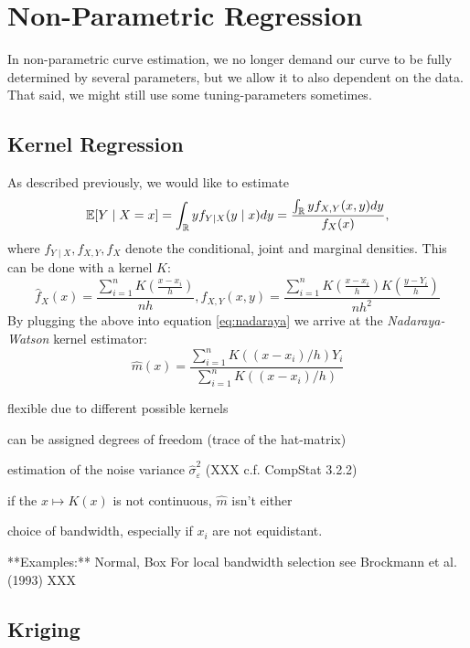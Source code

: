 \section{Non-Parametric Regression}
In non-parametric curve estimation, we no longer demand our curve to be fully determined by several parameters, but we allow it to also dependent on the data. That said, we might still use some tuning-parameters sometimes.
\subsection{Kernel Regression}
\label{sec:Kernel}
As described previously, we would like to estimate
\begin{equation}
  \label{eq:nadaraya}
  \mathbb{E}[Y \mid X=x]
  = \int_{\mathbb{R}} y f_{Y \mid X}(y \mid x) d y
  =\frac{\int_{\mathbb{R}} y f_{X, Y}(x, y) d y}{f_{X}(x)},
\end{equation}
where $f_{Y \mid X}, f_{X, Y}, f_{X}$ denote the conditional, joint and marginal densities.
This can be done with a kernel $K$:
$$
  \hat{f}_{X}(x)=\frac{\sum_{i=1}^{n} K\left(\frac{x-x_{i}}{h}\right)}{n h}, \hat{f}_{X, Y}(x, y)=\frac{\sum_{i=1}^{n} K\left(\frac{x-x_{i}}{h}\right) K\left(\frac{y-Y_{i}}{h}\right)}{n h^{2}}
$$
By plugging the above into equation \ref{eq:nadaraya} we arrive at the \textit{Nadaraya-Watson} kernel estimator:
$$\hat{m}(x)=\frac{\sum_{i=1}^{n} K\left(\left(x-x_{i}\right) / h\right) Y_{i}}{\sum_{i=1}^{n} K\left(\left(x-x_{i}\right) / h\right)}$$


\begin{my_pros_cons_table}{
    \item flexible due to different possible kernels
    \item can be assigned degrees of freedom (trace of the hat-matrix)
    \item estimation of the noise variance $\hat \sigma_\varepsilon^2$ (XXX c.f. CompStat 3.2.2)
  }{
    \item if the $x \mapsto K(x)$ is not continuous, $\hat m $ isn't either
    \item choice of bandwidth, especially if $x_i$ are not equidistant.
  }
\end{my_pros_cons_table}


**Examples:**
Normal, Box
For local bandwidth selection see Brockmann et al. (1993) XXX


\subsection{Kriging}
\label{sec:Kriging}

